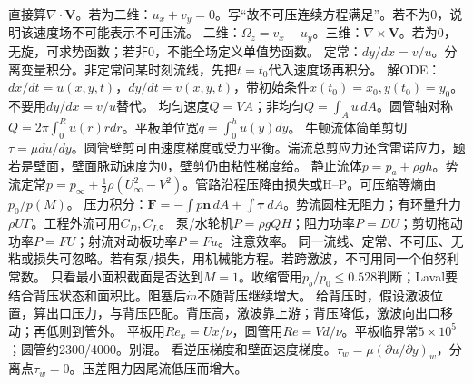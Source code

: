 直接算$\nabla\cdot\bm V$。若为二维：$u_x+v_y=0$。写“故不可压连续方程满足”。若不为0，说明该速度场不可能表示不可压流。
二维：$\Omega_z=v_x-u_y$。三维：$\nabla\times\bm V$。若为0，无旋，可求势函数；若非0，不能全场定义单值势函数。
定常：$dy/dx=v/u$。分离变量积分。非定常问某时刻流线，先把$t=t_0$代入速度场再积分。
解ODE：$dx/dt=u(x,y,t)$，$dy/dt=v(x,y,t)$，带初始条件$x(t_0)=x_0,y(t_0)=y_0$。不要用$dy/dx=v/u$替代。
均匀速度$Q=VA$；非均匀$Q=\int_Au\,dA$。圆管轴对称$Q=2\pi\int_0^Ru(r)rdr$。平板单位宽$q=\int_0^hu(y)dy$。
牛顿流体简单剪切$\tau=\mu du/dy$。圆管壁剪可由速度梯度或受力平衡。湍流总剪应力还含雷诺应力，题若是壁面，壁面脉动速度为0，壁剪仍由粘性梯度给。
静止流体$p=p_a+\rho gh$。势流定常$p=p_\infty+\frac12\rho(U_\infty^2-V^2)$。管路沿程压降由损失或H--P。可压缩等熵由$p_0/p(M)$。
压力积分：$\bm F=-\int p\bm n\,dA+\int\bm\tau\,dA$。势流圆柱无阻力；有环量升力$\rho U\Gamma$。工程外流可用$C_D,C_L$。
泵/水轮机$P=\rho gQH$；阻力功率$P=DU$；剪切拖动功率$P=FU$；射流对动板功率$P=Fu$。注意效率。
同一流线、定常、不可压、无粘或损失可忽略。若有泵/损失，用机械能方程。若跨激波，不可用同一个伯努利常数。
只看最小面积截面是否达到$M=1$。收缩管用$p_b/p_0\le0.528$判断；Laval要结合背压状态和面积比。阻塞后$\dot m$不随背压继续增大。
给背压时，假设激波位置，算出口压力，与背压匹配。背压高，激波靠上游；背压降低，激波向出口移动；再低则到管外。
平板用$Re_x=Ux/\nu$，圆管用$Re=Vd/\nu$。平板临界常$5\times10^5$；圆管约2300/4000。别混。
看逆压梯度和壁面速度梯度。$\tau_w=\mu(\partial u/\partial y)_w$，分离点$\tau_w=0$。压差阻力因尾流低压而增大。

